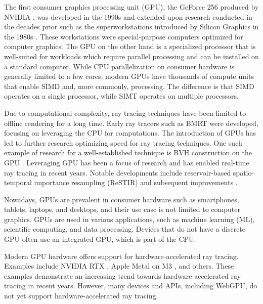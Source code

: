 The first consumer graphics processing unit (\gls{GPU}), the GeForce 256 produced by NVIDIA \cite{evolutionOfGPU}, was developed in the 1990s and extended upon research conducted in the decades prior such as the superworkstations introduced by Silicon Graphics in the 1980s \cite{sigWorkstation}. These workstations were special-purpose computers optimized for computer graphics. The \gls{GPU} on the other hand is a specialized processor that is well-suited for workloads which require parallel processing and can be installed on a standard computer. While \gls{CPU} parallelization on consumer hardware is generally limited to a few cores, modern \glspl{GPU} have thousands of compute units that enable \gls{SIMD} and, more commonly,  processing. The difference is that \gls{SIMD} operates on a single processor, while \gls{SIMT} operates on multiple processors.

Due to computational complexity, ray tracing techniques have been limited to offline rendering for a long time. Early ray tracers such as \gls{BMRT} were developed, focusing on leveraging the \gls{CPU} for computations. The introduction of \glspl{GPU} has led to further research optimizing speed for ray tracing techniques. One such example of research for a well-established technique is \gls{BVH} construction on the \gls{GPU} \cite{lauterbach2009GPUbvh}. Leveraging \gls{GPU} has been a focus of research and has enabled real-time ray tracing in recent years. Notable developments include reservoir-based spatio-temporal importance resampling (\gls{ReSTIR}) \cite{restir} and subsequent improvements \cite{restirAdvancements,restirGeneralized,restirArea}.

Nowadays, \glspl{GPU} are prevalent in consumer hardware such as smartphones, tablets, laptops, and desktops, and their use case is not limited to computer graphics. \glspl{GPU} are used in various applications, such as machine learning (\gls{ML}), scientific computing, and data processing. Devices that do not have a discrete \gls{GPU} often use an integrated \gls{GPU}, which is part of the \gls{CPU}.

Modern \gls{GPU} hardware offers support for hardware-accelerated ray tracing. Examples include NVIDIA RTX \cite{nvidiaRtxRayTracing}, Apple \gls{Metal} on M3 \cite{appleM3GpuAdvancements}, and others. These examples demonstrate an increasing trend towards hardware-accelerated ray tracing in recent years. However, many devices and \glspl{API}, including \gls{WebGPU}, do not yet support hardware-accelerated ray tracing.

